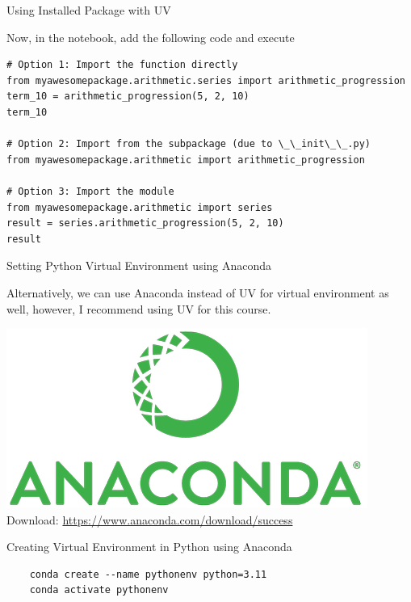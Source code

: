 \documentclass[aspectratio=169,xcolor=dvipsnames,svgnames,x11names,fleqn]{beamer}
\begin{document}
\begin{frame}[containsverbatim]{Using Installed Package with UV}

    Now, in the notebook, add the following code and execute

\begin{verbatim}
# Option 1: Import the function directly
from myawesomepackage.arithmetic.series import arithmetic_progression
term_10 = arithmetic_progression(5, 2, 10)
term_10

# Option 2: Import from the subpackage (due to \_\_init\_\_.py)
from myawesomepackage.arithmetic import arithmetic_progression

# Option 3: Import the module
from myawesomepackage.arithmetic import series
result = series.arithmetic_progression(5, 2, 10)
result
\end{verbatim}

\end{frame}

\begin{frame}{Setting Python Virtual Environment using Anaconda}

    Alternatively, we can use Anaconda instead of UV for virtual environment as well, however, I recommend using UV for this course.

    \begin{center}
        \includegraphics[width=0.4\linewidth]{figures/Anaconda_Logo.png}\\

        Download: \url{https://www.anaconda.com/download/success}
    \end{center}

\end{frame}

\begin{frame}[containsverbatim]{Creating Virtual Environment in Python using Anaconda}
    \begin{verbatim}
    conda create --name pythonenv python=3.11
    conda activate pythonenv
    \end{verbatim}
\end{frame}
\end{document}
